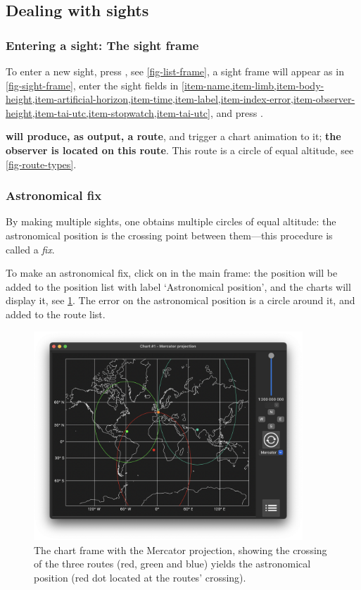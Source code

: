 \documentclass{ol-softwaremanual}
\begin{document}
\subsection{Dealing with sights}

\subsubsection{Entering a sight: The sight frame}


To enter a new sight, press  , see \cref{fig-list-frame}, a sight frame will appear as in \cref{fig-sight-frame}, enter the sight fields in  \cref{item-name,item-limb,item-body-height,item-artificial-horizon,item-time,item-label,item-index-error,item-observer-height,item-tai-utc,item-stopwatch,item-tai-utc}, and press . 

\textbf{\thel will produce, as output, a route}, and trigger a chart animation to it; \textbf{the observer is located  on this route}. This route is a circle of equal altitude, see \cref{fig-route-types}. 

\subsubsection{Astronomical fix}

By making multiple sights, one obtains multiple circles of equal altitude: the astronomical position is the crossing point between them---this procedure is called a \textit{fix}. 

To make an astronomical fix, click on  in the main frame: the position will be added to the position list with label `Astronomical position', and the charts will display it, see \cref{fig-astronomical-position}. The error on the astronomical position is a circle around it, and added to the route list. 

\begin{figure}
  \centering
  \includegraphics[width=0.9\textwidth]{figures/astronomical-position-mercator.png}
  \caption{
    \label{fig-astronomical-position}
    The chart frame with the Mercator projection, showing the crossing of the three routes (red, green and blue) yields the astronomical position (red dot located at the routes' crossing).  
  }
\end{figure}
\end{document}
